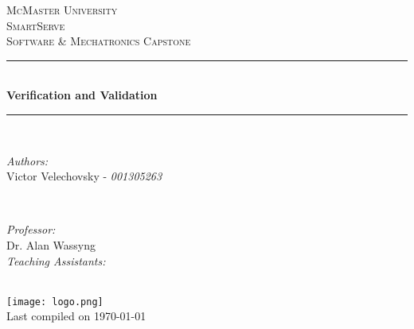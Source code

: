 \documentclass[11pt]{article}
\begin{document}
\begin{titlepage}
	\newcommand{\HRule}{\rule{\linewidth}{0.2mm}}
	\begin{center}
	\textsc{\LARGE McMaster University}\\[1.5cm]

	\textsc{\Large SmartServe}\\[0.5cm]
	\textsc{\large Software \& Mechatronics Capstone}\\[0.5cm]

	\HRule\\[0.4cm]
		{\huge\bfseries Verification and Validation}\\[0.4cm]
	\HRule\\[0.4cm]

	\begin{minipage}[t][][t]{0.5\textwidth}
		\begin{flushleft} \large
			\emph{Authors:}\\
			Victor Velechovsky - \textit{001305263} \\
		\end{flushleft}
	\end{minipage}
	~
	\begin{minipage}[t][][t]{0.4\textwidth}
		\begin{flushright} \large
			\emph{Professor:} \\
			Dr. Alan Wassyng \\[0.4cm]
			\emph{Teaching Assistants:} \\
		\end{flushright}
	\end{minipage}\\[2cm]

	\texttt{[image: logo.png]} \\
	{\large Last compiled on \today}
	\end{center}

\end{titlepage}

\tableofcontents

\listoffigures
\listoftables
\end{document}
